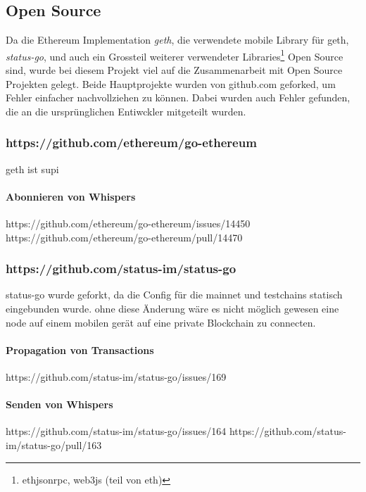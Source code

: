 \subsection{Open Source}
Da die Ethereum Implementation \emph{geth}, die verwendete mobile Library für geth, \emph{status-go}, und auch ein Grossteil weiterer verwendeter Libraries\footnote{ethjsonrpc, web3js (teil von eth)} Open Source sind, wurde bei diesem Projekt viel auf die Zusammenarbeit mit Open Source Projekten gelegt. Beide Hauptprojekte wurden von github.com geforked, um Fehler einfacher nachvollziehen zu können. Dabei wurden auch Fehler gefunden, die an die ursprünglichen Entiwckler mitgeteilt wurden.


\subsubsection{https://github.com/ethereum/go-ethereum}
geth ist supi

\paragraph{Abonnieren von Whispers}
https://github.com/ethereum/go-ethereum/issues/14450
https://github.com/ethereum/go-ethereum/pull/14470

\subsubsection{https://github.com/status-im/status-go}
status-go wurde geforkt, da die Config für die mainnet und testchains statisch eingebunden wurde. ohne diese Änderung wäre es nicht möglich gewesen eine node auf einem mobilen gerät auf eine private Blockchain zu connecten.

\paragraph{Propagation von Transactions}
https://github.com/status-im/status-go/issues/169

\paragraph{Senden von Whispers}
https://github.com/status-im/status-go/issues/164
https://github.com/status-im/status-go/pull/163
